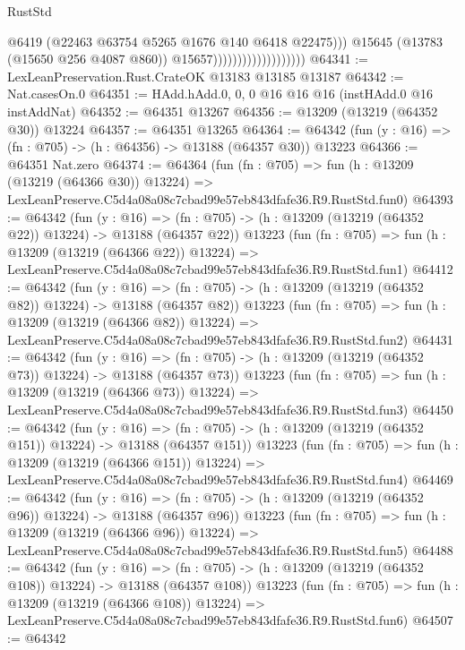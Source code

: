\begin{lexlean}{RustStd}
\begin{coremodule}
                                              @6419
                                              (@22463 @63754 @5265 @1676 @140 @6418 @22475)))
                                          @15645
                                          (@13783 (@15650 @256 @4087 @860))
                                          @15657)))))))))))))))))))
@64341 := LexLeanPreservation.Rust.CrateOK @13183 @13185 @13187
@64342 := Nat.casesOn.{0}
@64351 := HAdd.hAdd.{0, 0, 0} @16 @16 @16 (instHAdd.{0} @16 instAddNat)
@64352 := @64351 @13267
@64356 := @13209 (@13219 (@64352 @30)) @13224
@64357 := @64351 @13265
@64364 := @64342 (fun (y : @16) => (fn : @705) -> (h : @64356) -> @13188 (@64357 @30)) @13223
@64366 := @64351 Nat.zero
@64374 := @64364
    (fun (fn : @705) =>
    fun (h : @13209 (@13219 (@64366 @30)) @13224) =>
    LexLeanPreserve.C5d4a08a08c7cbad99e57eb843dfafe36.R9.RustStd.fun0)
@64393 := @64342
    (fun (y : @16) =>
    (fn : @705) -> (h : @13209 (@13219 (@64352 @22)) @13224) -> @13188 (@64357 @22))
    @13223
    (fun (fn : @705) =>
    fun (h : @13209 (@13219 (@64366 @22)) @13224) =>
    LexLeanPreserve.C5d4a08a08c7cbad99e57eb843dfafe36.R9.RustStd.fun1)
@64412 := @64342
    (fun (y : @16) =>
    (fn : @705) -> (h : @13209 (@13219 (@64352 @82)) @13224) -> @13188 (@64357 @82))
    @13223
    (fun (fn : @705) =>
    fun (h : @13209 (@13219 (@64366 @82)) @13224) =>
    LexLeanPreserve.C5d4a08a08c7cbad99e57eb843dfafe36.R9.RustStd.fun2)
@64431 := @64342
    (fun (y : @16) =>
    (fn : @705) -> (h : @13209 (@13219 (@64352 @73)) @13224) -> @13188 (@64357 @73))
    @13223
    (fun (fn : @705) =>
    fun (h : @13209 (@13219 (@64366 @73)) @13224) =>
    LexLeanPreserve.C5d4a08a08c7cbad99e57eb843dfafe36.R9.RustStd.fun3)
@64450 := @64342
    (fun (y : @16) =>
    (fn : @705) -> (h : @13209 (@13219 (@64352 @151)) @13224) -> @13188 (@64357 @151))
    @13223
    (fun (fn : @705) =>
    fun (h : @13209 (@13219 (@64366 @151)) @13224) =>
    LexLeanPreserve.C5d4a08a08c7cbad99e57eb843dfafe36.R9.RustStd.fun4)
@64469 := @64342
    (fun (y : @16) =>
    (fn : @705) -> (h : @13209 (@13219 (@64352 @96)) @13224) -> @13188 (@64357 @96))
    @13223
    (fun (fn : @705) =>
    fun (h : @13209 (@13219 (@64366 @96)) @13224) =>
    LexLeanPreserve.C5d4a08a08c7cbad99e57eb843dfafe36.R9.RustStd.fun5)
@64488 := @64342
    (fun (y : @16) =>
    (fn : @705) -> (h : @13209 (@13219 (@64352 @108)) @13224) -> @13188 (@64357 @108))
    @13223
    (fun (fn : @705) =>
    fun (h : @13209 (@13219 (@64366 @108)) @13224) =>
    LexLeanPreserve.C5d4a08a08c7cbad99e57eb843dfafe36.R9.RustStd.fun6)
@64507 := @64342

\end{coremodule}
\end{lexlean}
